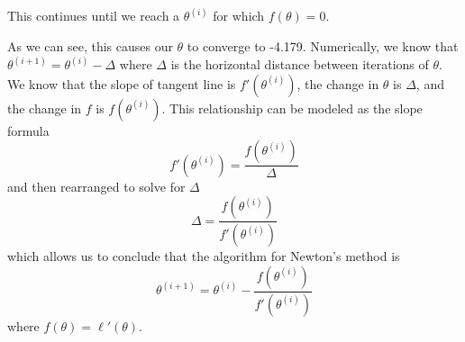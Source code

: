\documentclass[11pt]{article}
\begin{document}
\begin{center}
\end{center}
This continues until we reach a $\theta^{(i)}$ for which $f(\theta) = 0$.
\begin{center}
\end{center}
As we can see, this causes our $\theta$ to converge to -4.179. Numerically, we know that $\theta^{(i+1)} = \theta^{(i)} - \Delta$ where $\Delta$ is the horizontal distance between iterations of $\theta$. We know that the slope of tangent line is ${f}'\left(\theta^{(i)}\right)$, the change in $\theta$ is $\Delta$, and the change in $f$ is $f\left(\theta^{(i)}\right)$. This relationship can be modeled as the slope formula
$${f}'\left(\theta^{(i)}\right) = \frac{f\left(\theta^{(i)}\right)}{\Delta}$$
and then rearranged to solve for $\Delta$
$$\Delta = \frac{f\left(\theta^{(i)}\right)}{{f}'\left(\theta^{(i)}\right)}$$ which allows us to conclude that the algorithm for Newton's method is
$$\theta^{(i+1)} = \theta^{(i)} - \frac{f\left(\theta^{(i)}\right)}{{f}'\left(\theta^{(i)}\right)}$$ where $f(\theta) = {\ell}'(\theta)$.
\end{document}
